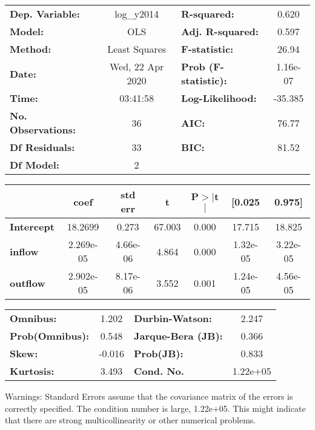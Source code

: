 \begin{center}
\begin{tabular}{lclc}
\toprule
\textbf{Dep. Variable:}    &    log\_y2014    & \textbf{  R-squared:         } &     0.620   \\
\textbf{Model:}            &       OLS        & \textbf{  Adj. R-squared:    } &     0.597   \\
\textbf{Method:}           &  Least Squares   & \textbf{  F-statistic:       } &     26.94   \\
\textbf{Date:}             & Wed, 22 Apr 2020 & \textbf{  Prob (F-statistic):} &  1.16e-07   \\
\textbf{Time:}             &     03:41:58     & \textbf{  Log-Likelihood:    } &   -35.385   \\
\textbf{No. Observations:} &          36      & \textbf{  AIC:               } &     76.77   \\
\textbf{Df Residuals:}     &          33      & \textbf{  BIC:               } &     81.52   \\
\textbf{Df Model:}         &           2      & \textbf{                     } &             \\
\bottomrule
\end{tabular}
\begin{tabular}{lcccccc}
                   & \textbf{coef} & \textbf{std err} & \textbf{t} & \textbf{P$> |$t$|$} & \textbf{[0.025} & \textbf{0.975]}  \\
\midrule
\textbf{Intercept} &      18.2699  &        0.273     &    67.003  &         0.000        &       17.715    &       18.825     \\
\textbf{inflow}    &    2.269e-05  &     4.66e-06     &     4.864  &         0.000        &     1.32e-05    &     3.22e-05     \\
\textbf{outflow}   &    2.902e-05  &     8.17e-06     &     3.552  &         0.001        &     1.24e-05    &     4.56e-05     \\
\bottomrule
\end{tabular}
\begin{tabular}{lclc}
\textbf{Omnibus:}       &  1.202 & \textbf{  Durbin-Watson:     } &    2.247  \\
\textbf{Prob(Omnibus):} &  0.548 & \textbf{  Jarque-Bera (JB):  } &    0.366  \\
\textbf{Skew:}          & -0.016 & \textbf{  Prob(JB):          } &    0.833  \\
\textbf{Kurtosis:}      &  3.493 & \textbf{  Cond. No.          } & 1.22e+05  \\
\bottomrule
\end{tabular}
\end{center}

Warnings: \newline
 [1] Standard Errors assume that the covariance matrix of the errors is correctly specified. \newline
 [2] The condition number is large, 1.22e+05. This might indicate that there are \newline
 strong multicollinearity or other numerical problems.